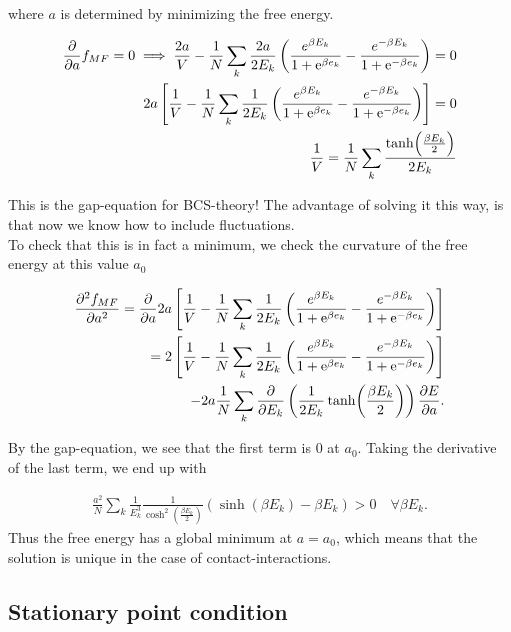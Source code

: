where $a$ is determined by minimizing the free energy. 

\begin{align*}
    \pdv{}{a}f_{MF} = 0 \implies \frac{2a}{V} - \frac{1}{N}\sum_k \frac{2a}{2E_k}\left(\frac{e^{\beta E_k}}{1 + \mathrm{e}^{\beta e_k}} - \frac{e^{-\beta E_k}}{1 + \mathrm{e}^{-\beta e_k}} \right) = 0 \\
    2a \left[\frac{1}{V} - \frac{1}{N}\sum_k \frac{1}{2E_k}\left(\frac{e^{\beta E_k}}{1 + \mathrm{e}^{\beta e_k}} - \frac{e^{-\beta E_k}}{1 + \mathrm{e}^{-\beta e_k}} \right) \right] = 0 \\ 
    \frac{1}{V} = \frac{1}{N} \sum_k \frac{\tanh(\frac{\beta E_k}{2})}{2E_k}
\end{align*}

This is the gap-equation for BCS-theory! The advantage of solving it this way, is that now we know how to include fluctuations. \\ 

To check that this is in fact a minimum, we check the curvature of the free energy at this value $a_0$

\begin{align*}
    \pdv{^2 f_{MF}}{a^2} = \pdv{}{a} 2a \left[\frac{1}{V} - \frac{1}{N}\sum_k \frac{1}{2E_k}\left(\frac{e^{\beta E_k}}{1 + \mathrm{e}^{\beta e_k}} - \frac{e^{-\beta E_k}}{1 + \mathrm{e}^{-\beta e_k}} \right) \right] \\ = 2\left[\frac{1}{V} - \frac{1}{N}\sum_k \frac{1}{2E_k}\left(\frac{e^{\beta E_k}}{1 + \mathrm{e}^{\beta e_k}} - \frac{e^{-\beta E_k}}{1 + \mathrm{e}^{-\beta e_k}} \right) \right] \\ - 2a \frac{1}{N} \sum_k \pdv{}{E_k}\left(\frac{1}{2E_k}\tanh(\frac{\beta E_k}{2})\right) \pdv{E}{a}.
\end{align*}

By the gap-equation, we see that the first term is $0$ at $a_0$. Taking the derivative of the last term, we end up with 

\begin{align*}
    \frac{a^2}{N}\sum_k \frac{1}{E_k ^3} \frac{1}{\cosh^2(\frac{\beta E_k}{2})} \left(\sinh(\beta E_k) - \beta E_k \right) > 0 \quad \forall \beta E_k.
\end{align*}
Thus the free energy has a global minimum at $a = a_0$, which means that the solution is unique in the case of contact-interactions. 

\subsection{Stationary point condition} 

